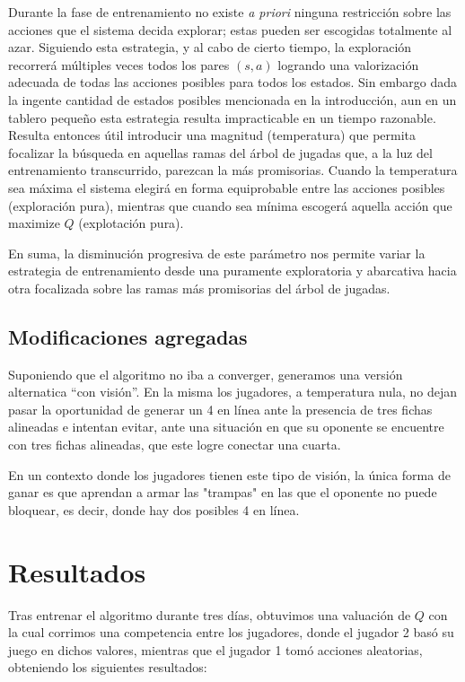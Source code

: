 \documentclass[11pt, spanish]{article}
\begin{document}
\par Durante la fase de entrenamiento no existe \emph{a priori} ninguna 
restricción sobre las acciones que el sistema decida explorar; estas pueden ser 
escogidas totalmente al azar. Siguiendo esta estrategia, y al cabo de 
cierto tiempo, la exploración recorrerá múltiples veces todos los pares 
$(s,a)$ logrando una valorización adecuada de todas las acciones posibles para 
todos los estados. Sin embargo dada la ingente cantidad de estados posibles 
mencionada en la introducción, aun en un tablero pequeño esta estrategia 
resulta impracticable en un tiempo razonable. Resulta entonces útil introducir 
una magnitud (temperatura) que permita focalizar la búsqueda en aquellas ramas 
del árbol de jugadas que, a la luz del entrenamiento transcurrido, parezcan la 
más promisorias. Cuando la temperatura sea máxima el sistema elegirá en forma 
equiprobable entre las acciones posibles (exploración pura), mientras que 
cuando sea mínima escogerá aquella acción que maximize $Q$ (explotación pura).
\par En suma, la disminución progresiva de este parámetro nos permite variar la 
estrategia de entrenamiento desde una puramente exploratoria y abarcativa hacia 
otra focalizada sobre las ramas más promisorias del árbol de jugadas.

\subsection{Modificaciones agregadas}

\par Suponiendo que el algoritmo no iba a converger, generamos una versión alternatica ``con visión''. En la misma los jugadores, a temperatura nula, no dejan pasar la oportunidad de generar un 4 en línea ante la presencia de tres fichas alineadas e intentan evitar, ante una situación en que su oponente se encuentre con tres fichas alineadas, que este logre conectar una cuarta.
\par En un contexto donde los jugadores tienen este tipo de visi\'on, la \'unica forma de ganar es que aprendan a armar las "trampas" en las que el oponente no puede bloquear, es decir, donde hay dos posibles 4 en línea.

\section{Resultados}

\par Tras entrenar el algoritmo durante tres días, obtuvimos una valuación de $Q$ con la cual corrimos una competencia entre los jugadores, donde el jugador 2 basó su juego en dichos valores, mientras que el jugador 1 tomó acciones aleatorias, obteniendo los siguientes resultados:
\end{document}
